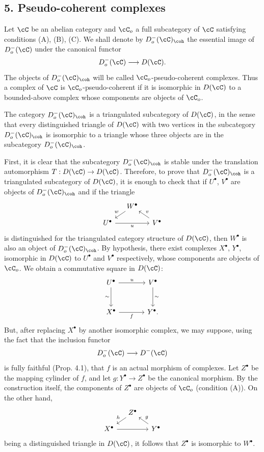 \subsection*{5. Pseudo-coherent complexes}

Let $\cC$ be an abelian category and $\cC_o$ a full subcategory of $\cC$ satisfying conditions (A), (B), (C). We shall denote by $D_o^-(\cC)_{\coh}$ the essential image of $D_o^-(\cC)$ under the canonical functor
\[
D_o^-(\cC)\longrightarrow D(\cC).
\]
The objects of $D_o^-(\cC)_{\coh}$ will be called $\cC_o$-pseudo-coherent complexes. Thus a complex of $\cC$ is $\cC_o$-pseudo-coherent if it is isomorphic in $D(\cC)$ to a bounded-above complex whose components are objects of $\cC_o$.

The category $D_o^-(\cC)_{\coh}$ is a triangulated subcategory of $D(\cC)$, in the sense that every distinguished triangle of $D(\cC)$ with two vertices in the subcategory $D_o^-(\cC)_{\coh}$ is isomorphic to a triangle whose three objects are in the subcategory $D_o^-(\cC)_{\coh}$.

First, it is clear that the subcategory $D_o^-(\cC)_{\coh}$ is stable under the translation automorphism $T:D(\cC)\to D(\cC)$. Therefore, to prove that $D_o^-(\cC)_{\coh}$ is a triangulated subcategory of $D(\cC)$, it is enough to check that if $U^\bullet$, $V^\bullet$ are objects of $D_o^-(\cC)_{\coh}$ and if the triangle
\[
\begin{tikzcd}[column sep=small,row sep=small]
& W^\bullet \arrow[dl,"w"']\\
U^\bullet \arrow[rr,"u"']&& V^\bullet \arrow[ul,"v"']
\end{tikzcd}
\]
is distinguished for the triangulated category structure of $D(\cC)$, then $W^\bullet$ is also an object of $D_o^-(\cC)_{\coh}$. By hypothesis, there exist complexes $X^\bullet$, $Y^\bullet$, isomorphic in $D(\cC)$ to $U^\bullet$ and $V^\bullet$ respectively, whose components are objects of $\cC_o$. We obtain a commutative square in $D(\cC)$:
\[
\begin{tikzcd}[column sep=large,row sep=large]
U^\bullet \arrow[r,"u"] \arrow[d,"\sim"']&V^\bullet \arrow[d,"\sim"]\\
X^\bullet \arrow[r,"f"']&Y^\bullet .
\end{tikzcd}
\]
But, after replacing $X^\bullet$ by another isomorphic complex, we may suppose, using the fact that the inclusion functor
\[
D_o^-(\cC)\longrightarrow D^-(\cC)
\]
is fully faithful (Prop. 4.1), that $f$ is an actual morphism of complexes. Let $Z^\bullet$ be the mapping cylinder of $f$, and let $g:Y^\bullet\to Z^\bullet$ be the canonical morphism. By the construction itself, the components of $Z^\bullet$ are objects of $\cC_o$ (condition (A)). On the other hand,
\[
\begin{tikzcd}[column sep=small,row sep=small]
&Z^\bullet \arrow[dl,"h"']\\
X^\bullet \arrow[rr]&&Y^\bullet \arrow[ul,"g"']
\end{tikzcd}
\]
being a distinguished triangle in $D(\cC)$, it follows that $Z^\bullet$ is isomorphic to $W^\bullet$.


